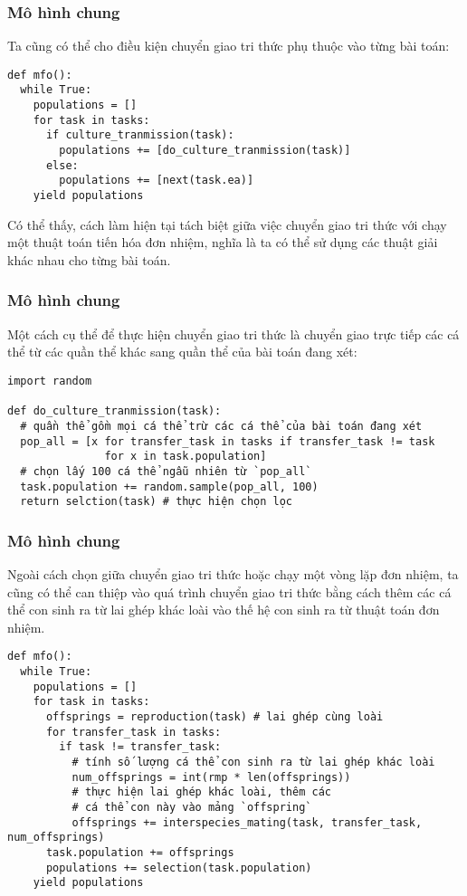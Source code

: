 \begin{frame}[fragile]
\frametitle{Mô hình chung}
Ta cũng có thể cho điều kiện chuyển giao tri thức phụ thuộc vào từng bài toán:
\begin{verbatim}
def mfo():
  while True:
    populations = []
    for task in tasks:
      if culture_tranmission(task):
        populations += [do_culture_tranmission(task)]
      else:
        populations += [next(task.ea)]
    yield populations
\end{verbatim}

Có thể thấy, cách làm hiện tại tách biệt giữa việc chuyển giao tri thức với chạy
một thuật toán tiến hóa đơn nhiệm, nghĩa là ta có thể sử dụng các thuật giải
khác nhau cho từng bài toán.
\end{frame}

\begin{frame}[fragile]
\frametitle{Mô hình chung}
  Một cách cụ thể để thực hiện chuyển giao tri thức là chuyển giao trực tiếp các
  cá thể từ các quần thể khác sang quần thể của bài toán đang xét:
  \begin{verbatim}
import random

def do_culture_tranmission(task):
  # quần thể gồm mọi cá thể trừ các cá thể của bài toán đang xét
  pop_all = [x for transfer_task in tasks if transfer_task != task
               for x in task.population]
  # chọn lấy 100 cá thể ngẫu nhiên từ `pop_all`
  task.population += random.sample(pop_all, 100)
  return selction(task) # thực hiện chọn lọc
  \end{verbatim}
\end{frame}

\begin{frame}[fragile]
\frametitle{Mô hình chung}
Ngoài cách chọn giữa chuyển giao tri thức hoặc chạy một vòng lặp đơn nhiệm, ta
cũng có thể can thiệp vào quá trình chuyển giao tri thức bằng cách thêm các cá
thể con sinh ra từ lai ghép khác loài vào thế hệ con sinh ra từ thuật toán đơn
nhiệm.
\begin{verbatim}
def mfo():
  while True:
    populations = []
    for task in tasks:
      offsprings = reproduction(task) # lai ghép cùng loài
      for transfer_task in tasks:
        if task != transfer_task:
          # tính số lượng cá thể con sinh ra từ lai ghép khác loài
          num_offsprings = int(rmp * len(offsprings))
          # thực hiện lai ghép khác loài, thêm các 
          # cá thể con này vào mảng `offspring`
          offsprings += interspecies_mating(task, transfer_task, num_offsprings)
      task.population += offsprings
      populations += selection(task.population)
    yield populations
\end{verbatim}
\end{frame}

